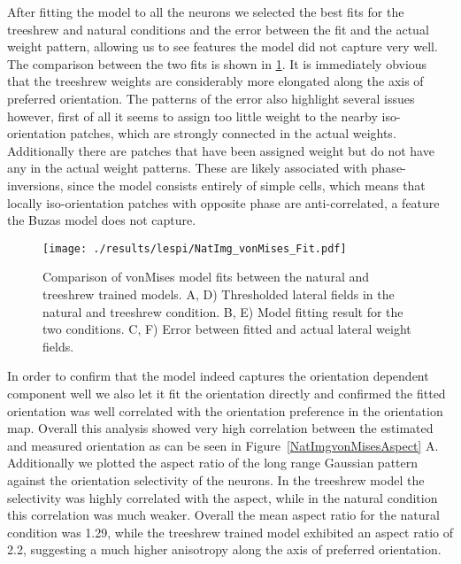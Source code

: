 After fitting the model to all the neurons we selected the best fits
for the treeshrew and natural conditions and the error between the fit
and the actual weight pattern, allowing us to see features the model
did not capture very well. The comparison between the two fits is
shown in \ref{NatImgvonMises}. It is immediately obvious that the
treeshrew weights are considerably more elongated along the axis of
preferred orientation. The patterns of the error also highlight
several issues however, first of all it seems to assign too little
weight to the nearby iso-orientation patches, which are strongly
connected in the actual weights. Additionally there are patches that
have been assigned weight but do not have any in the actual weight
patterns. These are likely associated with phase-inversions, since the
model consists entirely of simple cells, which means that locally
iso-orientation patches with opposite phase are anti-correlated, a
feature the Buzas model does not capture.

\begin{figure}
	\centering
        \texttt{[image: ./results/lespi/NatImg\_vonMises\_Fit.pdf]}
	\caption[Comparison of \cite{Buzas2006} vonMises model fit between
      the natural and treeshrew trained models.]{Comparison of
      \cite{Buzas2006} vonMises model fits between the natural and
      treeshrew trained models. A, D) Thresholded lateral fields in
      the natural and treeshrew condition. B, E) Model fitting result
      for the two conditions. C, F) Error between fitted and actual
      lateral weight fields.}
	\label{NatImgvonMises}
\end{figure}

In order to confirm that the model indeed captures the orientation
dependent component well we also let it fit the orientation directly
and confirmed the fitted orientation was well correlated with the
orientation preference in the orientation map. Overall this analysis
showed very high correlation between the estimated and measured
orientation as can be seen in Figure~\ref{NatImgvonMisesAspect}
A. Additionally we plotted the aspect ratio of the long range Gaussian
pattern against the orientation selectivity of the neurons. In the
treeshrew model the selectivity was highly correlated with the aspect,
while in the natural condition this correlation was much
weaker. Overall the mean aspect ratio for the natural condition was
1.29, while the treeshrew trained model exhibited an aspect ratio of
2.2, suggesting a much higher anisotropy along the axis of preferred
orientation.

